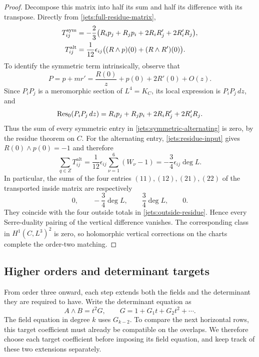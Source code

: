 \begin{proof}
Decompose this matrix into half its sum and half its difference with
its transpose.  Directly from \eqref{jets:full-residue-matrix},
\begin{align}
 T_{ij}^{\mathrm{sym}}
 &=-\frac23\bigl(R_ip_j+R_jp_i
                         +2R_iR_j'+2R_i'R_j\bigr),\notag\\
 T_{ij}^{\mathrm{alt}}
 &=\frac1{12}\epsilon_{ij}
                 \bigl((R\wedge p)(0)+(R\wedge R')(0)\bigr).
 \label{jets:symmetric-alternating}
\end{align}
To identify the symmetric term intrinsically, observe that
\[
 P=p+mr'=\frac{R(0)}z+p(0)+2R'(0)+O(z).
\]
Since $P_iP_j$ is a meromorphic section of $L^4=K_C$, its local
expression is $P_iP_j\,dz$, and
\[
 \operatorname{Res}_0(P_iP_j\,dz)
 =R_ip_j+R_jp_i+2R_iR_j'+2R_i'R_j.
\]
Thus the sum of every symmetric entry in
\eqref{jets:symmetric-alternating} is zero, by the residue theorem
on $C$.  For the alternating entry,
\eqref{jets:residue-input} gives $R(0)\wedge p(0)=-1$ and therefore
\[
 \sum_{q\in Z}T_{ij}^{\mathrm{alt}}
 =\frac1{12}\epsilon_{ij}\sum_{\nu=1}^6(W_\nu-1)
 =-\frac34\epsilon_{ij}\deg L.
\]
In particular, the sums of the four entries $(11),(12),(21),(22)$
of the transported inside matrix are respectively
\[
 0,\qquad -\frac34\deg L,\qquad
 \frac34\deg L,\qquad 0.
\]
They coincide with the four outside totals in
\eqref{jets:outside-residue}.  Hence every Serre-duality pairing of the
vertical difference vanishes.  The corresponding class in
$H^1(C,L^3)^2$ is zero, so holomorphic vertical corrections on the
charts complete the order-two matching.
\end{proof}

\subsection{Higher orders and determinant targets}

From order three onward, each step extends both the fields and the
determinant they are required to have.  Write the determinant equation as
\begin{equation}\label{jets:target-equation}
 A\wedge B=t^2G,\qquad G=1+G_1t+G_2t^2+\cdots.
\end{equation}
The field equation in degree $k$ uses $G_{k-2}$.  To compare the next
horizontal rows, this target coefficient must already be compatible
on the overlaps.  We therefore choose each target coefficient before
imposing its field equation, and keep track of these two extensions
separately.

